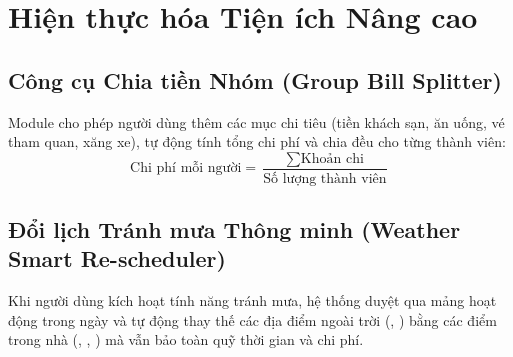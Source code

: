 \section{Hiện thực hóa Tiện ích Nâng cao}

\subsection{Công cụ Chia tiền Nhóm (Group Bill Splitter)}
Module cho phép người dùng thêm các mục chi tiêu (tiền khách sạn, ăn uống, vé tham quan, xăng xe), tự động tính tổng chi phí và chia đều cho từng thành viên:
$$\text{Chi phí mỗi người} = \frac{\sum \text{Khoản chi}}{\text{Số lượng thành viên}}$$

\subsection{Đổi lịch Tránh mưa Thông minh (Weather Smart Re-scheduler)}
Khi người dùng kích hoạt tính năng tránh mưa, hệ thống duyệt qua mảng hoạt động trong ngày và tự động thay thế các địa điểm ngoài trời (, ) bằng các điểm trong nhà (, , ) mà vẫn bảo toàn quỹ thời gian và chi phí.
